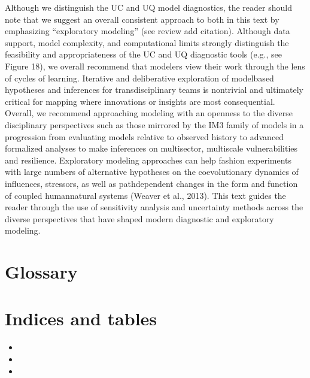 \documentclass[letterpaper,10pt,english]{sphinxmanual}
\begin{document}
\sphinxAtStartPar
Although we distinguish the UC and UQ model diagnostics, the reader should note that we suggest an overall consistent approach to both in this text by emphasizing “exploratory modeling” (see review add citation). Although data support, model complexity, and computational limits strongly distinguish the feasibility and appropriateness of the UC and UQ diagnostic tools (e.g., see Figure 18), we overall recommend that modelers view their work through the lens of cycles of learning. Iterative and deliberative exploration of model\sphinxhyphen{}based hypotheses and inferences for transdisciplinary teams is non\sphinxhyphen{}trivial and ultimately critical for mapping where innovations or insights are most consequential. Overall, we recommend approaching modeling with an openness to the diverse disciplinary perspectives such as those mirrored by the IM3 family of models in a progression from evaluating models relative to observed history to advanced formalized analyses to make inferences on multi\sphinxhyphen{}sector, multi\sphinxhyphen{}scale vulnerabilities and resilience. Exploratory modeling approaches can help fashion experiments with large numbers of alternative hypotheses on the co\sphinxhyphen{}evolutionary dynamics of influences, stressors, as well as path\sphinxhyphen{}dependent changes in the form and function of coupled human\sphinxhyphen{}natural systems (Weaver et al., 2013). This text guides the reader through the use of sensitivity analysis and uncertainty methods across the diverse perspectives that have shaped modern diagnostic and exploratory modeling.


\chapter{Glossary}
\label{\detokenize{8_glossary:glossary}}\label{\detokenize{8_glossary::doc}}
\sphinxAtStartPar



\chapter{Indices and tables}
\label{\detokenize{index:indices-and-tables}}\begin{itemize}
\item {} 
\sphinxAtStartPar
{}

\item {} 
\sphinxAtStartPar
{}

\item {} 
\sphinxAtStartPar
{}

\end{itemize}
\end{document}
